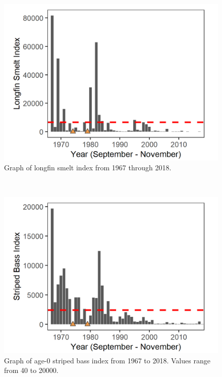 \documentclass[
]{book}
\begin{document}
\begin{panel-grid}
\begin{columns-nocenter}
\begin{column800}
\begin{expand}
\begin{figure}
\includegraphics[width=15.25in]{figures/FMWT_LFS_1966} \caption{Graph of longfin smelt index from 1967 through 2018.}\label{fig:unnamed-chunk-125}
\end{figure}

\end{expand}

\end{column800}

\begin{column40}

~

\end{column40}

\begin{column800}

\begin{expand}

\begin{figure}
\includegraphics[width=15.25in]{figures/FMWT_sb0_1966} \caption{Graph of age-0 striped bass index from 1967 to 2018. Values range from 40 to 20000.}\label{fig:unnamed-chunk-126}
\end{figure}


\end{expand}
\end{column800}
\end{columns-nocenter}
\end{panel-grid}
\end{document}

